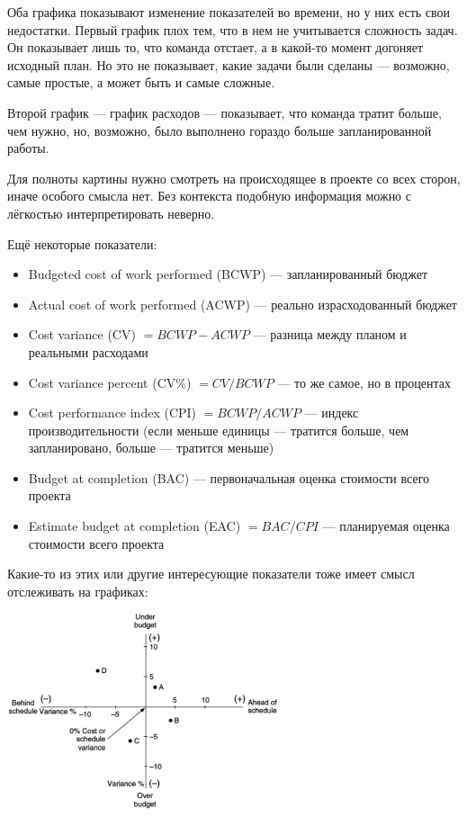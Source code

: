 \documentclass{../../text-style}
\begin{document}
Оба графика показывают изменение показателей во времени, но у них есть свои недостатки. Первый график плох тем, что в нем не учитывается сложность задач. Он показывает лишь то, что команда отстает, а в какой-то момент догоняет исходный план. Но это не показывает, какие задачи были сделаны --- возможно, самые простые, а может быть и самые сложные.

Второй график --- график расходов --- показывает, что команда тратит больше, чем нужно, но, возможно, было выполнено гораздо больше запланированной работы.

Для полноты картины нужно смотреть на происходящее в проекте со всех сторон, иначе особого смысла нет. Без контекста подобную информация можно с лёгкостью интерпретировать неверно.

Ещё некоторые показатели:

\begin{itemize}
    \item Budgeted cost of work performed (BCWP) --- запланированный бюджет
    \item Actual cost of work performed (ACWP) --- реально израсходованный бюджет
    \item Cost variance (CV) $= BCWP - ACWP$ --- разница между планом и реальными расходами
    \item Cost variance percent (CV\%) $= CV / BCWP$ --- то же самое, но в процентах
    \item Cost performance index (CPI) $= BCWP / ACWP$ --- индекс производительности (если меньше единицы --- тратится больше, чем запланировано, больше --- тратится меньше)
    \item Budget at completion (BAC) --- первоначальная оценка стоимости всего проекта
    \item Estimate budget at completion (EAC) $= BAC / CPI$ --- планируемая оценка стоимости всего проекта
\end{itemize}

Какие-то из этих или другие интересующие показатели тоже имеет смысл отслеживать на графиках:

\begin{center}
    \includegraphics[width=0.6\textwidth]{varianceGraph.png}
\end{center}
\end{document}
